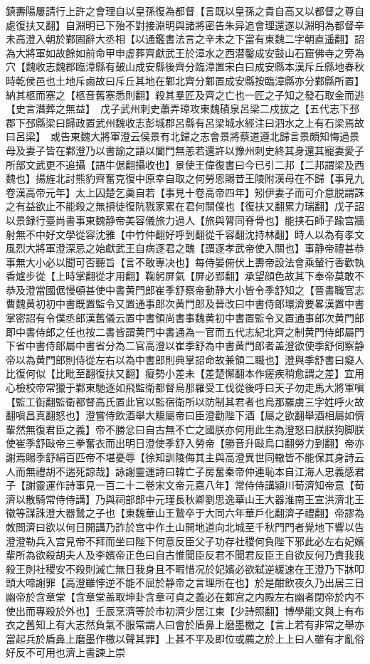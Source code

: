 鎮夀陽屢請行上許之會理自以皇孫復為都督【言既以皇孫之貴自高又以都督之尊自處復扶又翻】自淵明已下殆不對接淵明與諸將密告朱异追會理還遂以淵明為都督辛未高澄入朝於鄴固辭大丞相【以通鑑書法言之辛未之下當有東魏二字朝直遥翻】詔為大將軍如故餘如前命甲申虚葬齊獻武王於漳水之西潜鑿成安鼓山石窟佛寺之旁為穴【魏收志魏郡臨漳縣有皷山成安縣後齊分臨漳置宋白曰成安縣本漢斥丘縣地春秋時乾侯邑也土地斥鹵故曰斥丘其地在鄴北齊分鄴置成安縣按臨漳縣亦分鄴縣所置】納其柩而塞之【柩音舊塞悉則翻】殺其羣匠及齊之亡也一匠之子知之發石取金而逃【史言潛葬之無益】　戊子武州刺史蕭弄璋攻東魏磧泉呂梁二戍拔之【五代志下邳郡下邳縣梁曰歸政置武州魏收志彭城郡呂縣有呂梁城水經注曰泗水之上有石梁焉故曰呂梁】　或告東魏大將軍澄云侯景有北歸之志會景將蔡道遵北歸言景頗知悔過景母及妻子皆在鄴澄乃以書諭之語以闔門無恙若還許以豫州刺史終其身還其寵妻愛子所部文武更不追攝【語牛倨翻攝收也】景使王偉復書曰今已引二邦【二邦謂梁及西魏也】揚旌北討熊豹齊奮克復中原幸自取之何勞恩賜昔王陵附漢母在不歸【事見九卷漢高帝元年】太上囚楚乞羮自若【事見十卷高帝四年】矧伊妻子而可介意脱謂誅之有益欲止不能殺之無損徒復阬戮家累在君何關僕也【復扶又翻累力瑞翻】戊子詔以景録行臺尚書事東魏静帝美容儀旅力過人【旅與膂同脊骨也】能挟石師子踰宫牆射無不中好文學從容沈雅【中竹仲翻好呼到翻從千容翻沈持林翻】時人以為有孝文風烈大將軍澄深忌之始獻武王自病逐君之醜【謂逐孝武帝使入關也】事静帝禮甚恭事無大小必以聞可否聽旨【言不敢專决也】每侍晏俯伏上夀帝設法會乘輦行香歡執香爐步從【上時掌翻從才用翻】鞠躬屏氣【屏必郢翻】承望顔色故其下奉帝莫敢不恭及澄當國倨慢頓甚使中書黄門郎崔季舒察帝動静大小皆令季舒知之【晉書職官志曹魏黄初初中書既置監令又置通事郎次黄門郎及晉改曰中書侍郎環濟要畧漢置中書掌密詔有令僕丞郎漢舊儀云置中書領尚書事魏黄初中書置監令又置通事郎次黄門郎即中書侍郎之任也按二書皆謂黄門中書通為一官而五代志紀北齊之制黄門侍郎屬門下省中書侍郎屬中書省分為二官高澄以崔季舒為中書黄門郎者盖澄欲使季舒伺察静帝以為黄門郎則侍從左右以為中書郎則典掌詔命故兼領二職也】澄與季舒書曰癡人比復何似【比毗至翻復扶又翻】癡勢小差未【差楚懈翻本作瘥疾稍愈謂之差】宜用心檢校帝常獵于鄴東馳逐如飛監衛都督烏那羅受工伐從後呼曰天子勿走馬大將軍嗔【監工衘翻監衛都督高氏置此官以監宿衛所以防制其君者也烏那羅虜三字姓呼火故翻嗔昌真翻怒也】澄嘗侍飲酒舉大觴屬帝曰臣澄勸陛下酒【屬之欲翻舉酒相屬如儕輩然無復君臣之義】帝不勝忿曰自古無不亡之國朕亦何用此生為澄怒曰朕朕狗脚朕使崔季舒敺帝三拳奮衣而出明日澄使季舒入勞帝【勝音升敺烏口翻勞力到翻】帝亦謝焉賜季舒絹百匹帝不堪憂辱【徐知訓陵侮其主與高澄異世同轍皆不能保其身詩云人而無禮胡不遄死諒哉】詠謝靈運詩曰韓亡子房奮秦帝仲連恥本自江海人忠義感君子【謝靈運作詩事見一百二十二卷宋文帝元嘉八年】常侍侍講潁川荀濟知帝意【荀濟以散騎常侍侍講】乃與祠部郎中元瑾長秋卿劉思逸華山王大器淮南王宣洪濟北王徽等謀誅澄大器鷙之子也【東魏華山王鷙卒于大同六年華戶化翻濟子禮翻】帝謬為敇問濟曰欲以何日開講乃詐於宫中作土山開地道向北城至千秋門門者覺地下響以告澄澄勒兵入宫見帝不拜而坐曰陛下何意反臣父子功存社稷何負陛下邪此必左右妃嬪輩所為欲殺胡夫人及李嬪帝正色曰自古惟聞臣反君不聞君反臣王自欲反何乃責我我殺王則社稷安不殺則滅亡無日我身且不暇惜况於妃嬪必欲弑逆緩速在王澄乃下牀叩頭大啼謝罪【高澄雖悖逆不能不屈於静帝之言理所在也】於是酣飲夜久乃出居三日幽帝於含章堂【含章堂盖取坤卦含章可貞之義必在鄴宫之内殿左右幽者閉帝於内不使出而專殺於外也】壬辰烹濟等於市初濟少居江東【少詩照翻】博學能文與上有布衣之舊知上有大志然負氣不服常謂人曰會於盾鼻上磨墨檄之【言上若有非常之舉亦當起兵於盾鼻上磨墨作檄以聲其罪】上甚不平及即位或薦之於上上曰人雖有才亂俗好反不可用也濟上書諫上崇